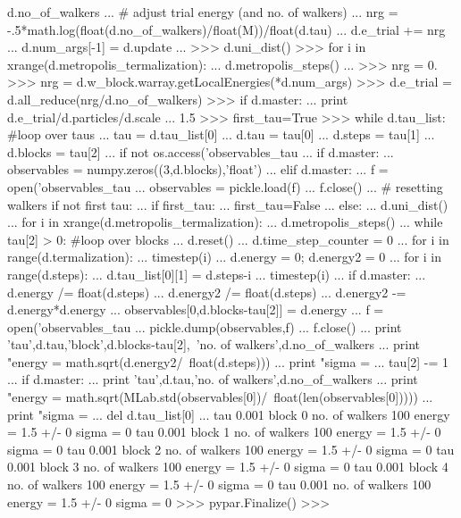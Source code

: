 \begin{DoxyVerb}
               d.no_of_walkers
...     # adjust trial energy (and no. of walkers)
...     nrg = -.5*math.log(float(d.no_of_walkers)/float(M))/float(d.tau)
...     d.e_trial += nrg
...     d.num_args[-1] = d.update
...
>>> d.uni_dist()
>>> for i in xrange(d.metropolis_termalization):
...     d.metropolis_steps()
...
>>> nrg = 0.
>>> nrg = d.w_block.warray.getLocalEnergies(*d.num_args)
>>> d.e_trial = d.all_reduce(nrg/d.no_of_walkers)
>>> if d.master:
...     print d.e_trial/d.particles/d.scale
...
1.5
>>> first_tau=True
>>> while d.tau_list: #loop over taus
...     tau = d.tau_list[0]
...     d.tau   = tau[0]
...     d.steps = tau[1]
...     d.blocks = tau[2]
...     if not os.access('observables_tau%
...         if d.master:
...             observables = numpy.zeros((3,d.blocks),'float')
...     elif d.master:
...         f = open('observables_tau%
...         observables = pickle.load(f)
...         f.close()
...     # resetting walkers if not first tau:
...     if first_tau:
...         first_tau=False
...     else:
...         d.uni_dist()
...         for i in xrange(d.metropolis_termalization):
...             d.metropolis_steps()
...     while tau[2] > 0: #loop over blocks
...         d.reset()
...         d.time_step_counter = 0
...         for i in range(d.termalization):
...             timestep(i)
...         d.energy = 0; d.energy2 = 0
...         for i in range(d.steps):
...             d.tau_list[0][1] = d.steps-i
...             timestep(i)
...         if d.master:
...             d.energy  /= float(d.steps)
...             d.energy2 /= float(d.steps)
...             d.energy2 -= d.energy*d.energy
...             observables[0,d.blocks-tau[2]] = d.energy
...             f = open('observables_tau%
...             pickle.dump(observables,f)
...             f.close()
...             print 'tau',d.tau,'block',d.blocks-tau[2],\
               'no. of walkers',d.no_of_walkers
...             print "energy = %
                                     math.sqrt(d.energy2/\
                                               float(d.steps)))
...             print "sigma = %
...         tau[2] -= 1
...     if d.master:
...         print 'tau',d.tau,'no. of walkers',d.no_of_walkers
...         print "energy = %
                                 math.sqrt(MLab.std(observables[0])/\
                                           float(len(observables[0]))))
...         print "sigma = %
...     del d.tau_list[0]
...
tau 0.001 block 0 no. of walkers 100
energy = 1.5 +/- 0
sigma = 0
tau 0.001 block 1 no. of walkers 100
energy = 1.5 +/- 0
sigma = 0
tau 0.001 block 2 no. of walkers 100
energy = 1.5 +/- 0
sigma = 0
tau 0.001 block 3 no. of walkers 100
energy = 1.5 +/- 0
sigma = 0
tau 0.001 block 4 no. of walkers 100
energy = 1.5 +/- 0
sigma = 0
tau 0.001 no. of walkers 100
energy = 1.5 +/- 0
sigma = 0
>>> pypar.Finalize()
>>>
\end{DoxyVerb}
 

